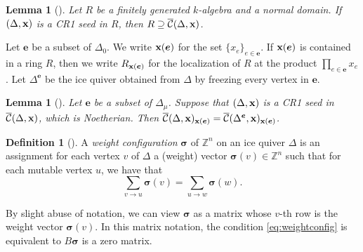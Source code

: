 \documentclass{amsart}
\newtheorem{lemma}[theorem]{Lemma}
\theoremstyle{definition}
\newtheorem{definition}[theorem]{Definition}
\theoremstyle{remark}
\numberwithin{equation}{section}
\newcommand{\mc}[1]{\mathcal{#1}}
\newcommand{\mb}[1]{\mathbb{#1}}
\renewcommand{\b}[1]{\bold{#1}}
\newcommand{\bs}[1]{\boldsymbol{#1}}
\newcommand{\br}[1]{\overline{#1}}
\newcommand{\uca}{\br{\mc{C}}}
\begin{document}
\begin{lemma}[{\cite[Proposition 3.6]{FP}}] \label{L:RCA}
	Let $R$ be a finitely generated $k$-algebra and a normal domain.
	If $(\Delta,\b{x})$ is a CR1 seed in $R$, then $R\supseteq\uca(\Delta,\b{x})$.
\end{lemma}


Let $\bs{e}$ be a subset of $\Delta_0$. We write $\b{x}(\bs{e})$ for the set $\{x_e\}_{e\in\bs{e}}$.
If $\b{x}(\bs{e})$ is contained in a ring $R$, then we write $R_{\b{x}(\bs{e})}$ for the localization of $R$ at the product $\prod_{e\in\bs{e}}x_e$.
Let $\Delta^{\bs{e}}$ be the ice quiver obtained from $\Delta$ by freezing every vertex in $\bs{e}$.
\begin{lemma}[{\cite[Lemma 2.4]{Fs2}}] \label{L:reduce2frozen} Let $\bs{e}$ be a subset of $\Delta_\mu$.
	Suppose that $(\Delta,\b{x})$ is a CR1 seed in $\uca(\Delta,\b{x})$, which is Noetherian.
	Then $\uca(\Delta,\b{x})_{{\b{x}}(\bs{e})}=\uca(\Delta^{\bs{e}},\b{x})_{{\b{x}}(\bs{e})}$.
\end{lemma}


\begin{definition}[\cite{Fs1}] \label{D:wtconfig} A {\em weight configuration} $\bs{\sigma}$ of $\mb{Z}^n$ on an ice quiver $\Delta$ is an assignment for each vertex $v$ of $\Delta$ a (weight) vector $\bs{\sigma}(v)\in \mb{Z}^n$ such that for each mutable vertex $u$, we have that
	\begin{equation} \label{eq:weightconfig}
	\sum_{v\to u} \bs{\sigma}(v) = \sum_{u\to w} \bs{\sigma}(w).
	\end{equation}
\end{definition}

\noindent %
By slight abuse of notation, we can view $\bs{\sigma}$ as a matrix whose $v$-th row is the weight vector $\bs{\sigma}(v)$.
In this matrix notation, the condition \eqref{eq:weightconfig} is equivalent to $B\bs{\sigma}$ is a zero matrix.
\end{document}
